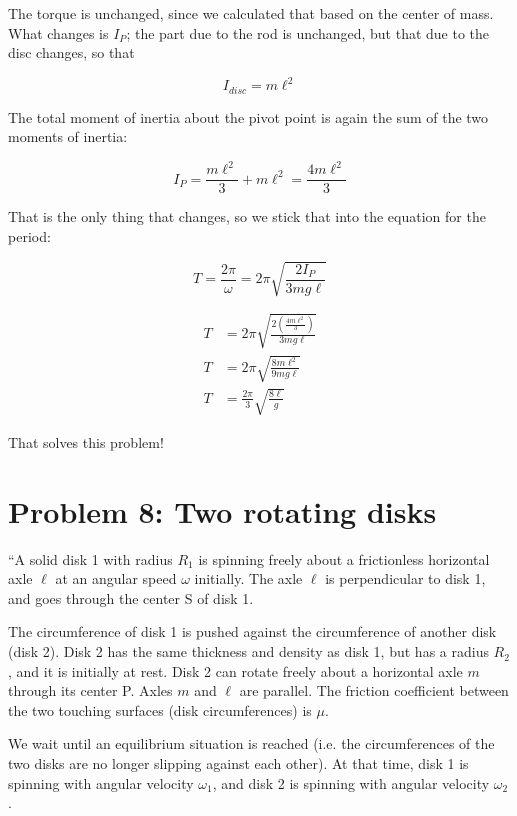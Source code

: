 \documentclass[8.01x]{subfiles}
\begin{document}
The torque is unchanged, since we calculated that based on the center of mass. What changes is $I_P$; the part due to the rod is unchanged, but that due to the disc changes, so that

\begin{equation}
I_{disc} = m \ell^2
\end{equation}

The total moment of inertia about the pivot point is again the sum of the two moments of inertia:

\begin{equation}
I_P = \frac{m \ell^2}{3} + m \ell^2 = \frac{4 m \ell^2}{3}
\end{equation}

That is the only thing that changes, so we stick that into the equation for the period:

\begin{equation}
T = \frac{2 \pi}{\omega} = 2 \pi \sqrt{\frac{2 I_P}{3 m g \ell}}
\end{equation}

\begin{align}
T &= 2 \pi \sqrt{\frac{2 (\frac{4m \ell^2}{3})}{3 m g \ell}}\\
T &= 2 \pi \sqrt{\frac{8m \ell^2}{9 m g \ell}}\\
T &= \frac{2 \pi}{3} \sqrt{\frac{8 \ell}{g}}
\end{align}

That solves this problem!

\section{Problem 8: Two rotating disks}

``A solid disk 1 with radius $R_1$ is spinning freely about a frictionless horizontal axle $\ell$ at an angular speed $\omega$ initially. The axle $\ell$ is perpendicular to disk 1, and goes through the center S of disk 1.

The circumference of disk 1 is pushed against the circumference of another disk (disk 2). Disk 2 has the same thickness and density as disk 1, but has a radius $R_2$, and it is initially at rest. Disk 2 can rotate freely about a horizontal axle $m$ through its center P. Axles $m$ and $\ell$ are parallel. The friction coefficient between the two touching surfaces (disk circumferences) is $\mu$.

We wait until an equilibrium situation is reached (i.e. the circumferences of the two disks are no longer slipping against each other). At that time, disk 1 is spinning with angular velocity $\omega_1$, and disk 2 is spinning with angular velocity $\omega_2$.
\end{document}
